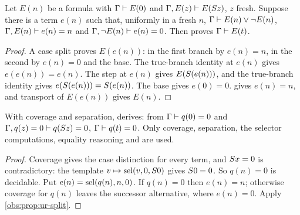 \begin{proposition}
\label{obs:prop:ur-split}
Let $E(n)$ be a formula with $\Gamma\vdash E(0)$ and
$\Gamma,E(z)\vdash E(S z)$, $z$ fresh. Suppose there is a term $e(n)$ such
that, uniformly in a fresh $n$, $\Gamma\vdash E(n)\vee\neg E(n)$,
$\Gamma,E(n)\vdash e(n)=n$ and $\Gamma,\neg E(n)\vdash e(n)=0$. Then
 proves $\Gamma\vdash E(t)$.
\end{proposition}

\begin{proof}
A case split proves $E(e(n))$: in the first branch by $e(n)=n$, in the second
by $e(n)=0$ and the base. The true-branch identity at $e(n)$ gives
$e(e(n))=e(n)$. The step at $e(n)$ gives $E(S(e(n)))$, and the true-branch
identity gives $e(S(e(n)))=S(e(n))$. The base gives $e(0)=0$.
 gives $e(n)=n$, and transport of $E(e(n))$ gives
$E(n)$.
\end{proof}

\begin{corollary}
\label{obs:cor:ur-zero}
With coverage and separation,  derives: from
$\Gamma\vdash q(0)=0$ and $\Gamma,q(z)=0\vdash q(S z)=0$,
$\Gamma\vdash q(t)=0$. Only coverage, separation, the selector computations,
equality reasoning and  are used.
\end{corollary}

\begin{proof}
Coverage gives the case distinction for every term, and $S x=0$ is
contradictory: the template $v\mapsto\operatorname{sel}(v,0,S 0)$ gives $S 0=0$. So
$q(n)=0$ is decidable. Put $e(n)=\operatorname{sel}(q(n),n,0)$. If $q(n)=0$ then $e(n)=n$;
otherwise coverage for $q(n)$ leaves the successor alternative, where
$e(n)=0$. Apply \cref{obs:prop:ur-split}.
\end{proof}

